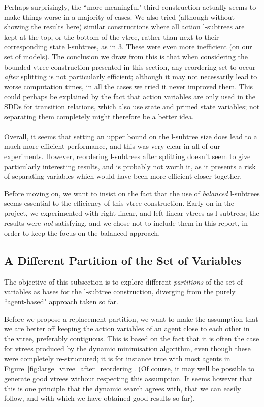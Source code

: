 \documentclass[11pt]{report}
\begin{document}
Perhaps surprisingly, the ``more meaningful" third construction actually seems to make things worse in a majority of cases. We also tried (although without showing the results here) similar constructions where all action l-subtrees are kept at the top, or the bottom of the vtree, rather than next to their corresponding state l-subtrees, as in 3. These were even more inefficient (on our set of models).
 The conclusion we draw from this is that when considering the bounded vtree construction presented in this section, any reordering set to occur \textit{after} splitting is not particularly efficient; although it may not necessarily lead to worse computation times, in all the cases we tried it never improved them. This could perhaps be explained by the fact that action variables are only used in the SDDs for transition relations, which also use state and primed state variables; not separating them completely might therefore be a better idea.
 \\\\
Overall, it seems that setting an upper bound on the l-subtree size does lead to a much more efficient performance, and this was very clear in all of our experiments. However, reordering l-subtrees after splitting doesn't seem to give particularly interesting results, and is probably not worth it, as it presents a risk of separating variables which would have been more efficient closer together. 

Before moving on, we want to insist on the fact that the use of \textit{balanced} l-subtrees seems essential to the efficiency of this vtree construction. Early on in the project, we experimented with right-linear, and left-linear vtrees as l-subtrees; the results were \textit{not} satisfying, and we chose not to include them in this report, in order to keep the focus on the balanced approach.

\subsection{A Different Partition of the Set of Variables}

The objective of this subsection is to explore different \textit{partitions} of the set of variables as bases for the l-subtree construction, diverging from the purely ``agent-based" approach taken so far. 

Before we propose a replacement partition, we want to make the assumption that we are better off keeping the action variables of an agent close to each other in the vtree, preferably contiguous. This is based on the fact that it is often the case for vtrees produced by the dynamic minimisation algorithm, even though these were completely re-structured; it is for instance true with most agents in
 Figure~\ref{fig:large_vtree_after_reordering}.
(Of course, it may well be possible to generate good vtrees without respecting this assumption. It seems however that this is one principle that the dynamic search agrees with, that we can easily follow, and with which we have obtained good results so far).
\end{document}
